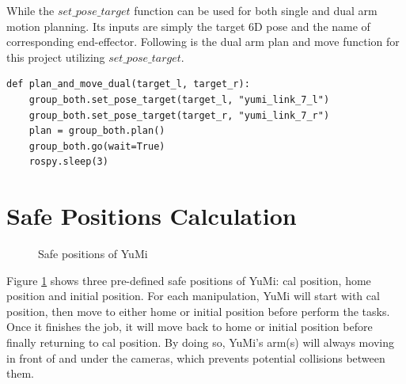 While the $set\_pose\_target$ function can be used for both single and dual arm motion planning. Its inputs are simply the target 6D pose and the name of corresponding end-effector. Following is the dual arm plan and move function for this project utilizing $set\_pose\_target$. 

\begin{verbatim}
def plan_and_move_dual(target_l, target_r):
    group_both.set_pose_target(target_l, "yumi_link_7_l")
    group_both.set_pose_target(target_r, "yumi_link_7_r")
    plan = group_both.plan()
    group_both.go(wait=True)
    rospy.sleep(3)
\end{verbatim}



\section{Safe Positions Calculation} \label{safetyposescalculation}

\begin{figure}[H]
\centering
{}
\caption{Safe positions of YuMi}
\label{safeposition}
\end{figure}

Figure \ref{safeposition} shows three pre-defined safe positions of YuMi: cal position, home position and initial position. For each manipulation, YuMi will start with cal position, then move to either home or initial position before perform the tasks. Once it finishes the job, it will move back to home or initial position before finally returning to cal position. By doing so, YuMi's arm(s) will always moving in front of and under the cameras, which prevents potential collisions between them.

